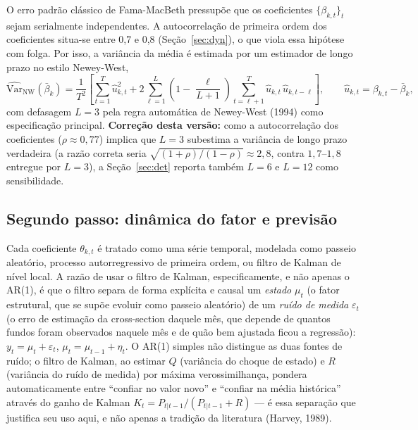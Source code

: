 \documentclass[12pt,a4paper]{article}
\begin{document}
O erro padrão clássico de Fama-MacBeth pressupõe que os coeficientes $\{\beta_{k,t}\}_t$ sejam
serialmente independentes. A autocorrelação de primeira ordem dos coeficientes situa-se entre
0,7 e 0,8 (Seção~\ref{sec:dyn}), o que viola essa hipótese com folga. Por isso, a variância da
média é estimada por um estimador de longo prazo no estilo Newey-West,
\begin{equation}
\widehat{\mathrm{Var}}_{\text{NW}}(\bar{\beta}_k) = \frac{1}{T^{2}}\!\left[
\sum_{t=1}^{T}\widehat{u}_{k,t}^{2}
+ 2\sum_{\ell=1}^{L}\!\left(1-\frac{\ell}{L+1}\right)\!\sum_{t=\ell+1}^{T}\widehat{u}_{k,t}\,\widehat{u}_{k,t-\ell}
\right], \qquad \widehat{u}_{k,t}=\beta_{k,t}-\bar{\beta}_k,
\label{eq:nw}
\end{equation}
com defasagem $L=3$ pela regra automática de Newey-West (1994) como especificação principal.
\textbf{Correção desta versão:} como a autocorrelação dos coeficientes ($\rho\approx0{,}77$)
implica que $L=3$ subestima a variância de longo prazo verdadeira (a razão correta seria
$\sqrt{(1+\rho)/(1-\rho)}\approx2{,}8$, contra $1{,}7$--$1{,}8$ entregue por $L=3$), a
Seção~\ref{sec:det} reporta também $L=6$ e $L=12$ como sensibilidade.

\subsection{Segundo passo: dinâmica do fator e previsão}

Cada coeficiente $\theta_{k,t}$ é tratado como uma série temporal, modelada como passeio
aleatório, processo autorregressivo de primeira ordem, ou filtro de Kalman de nível local. A
razão de usar o filtro de Kalman, especificamente, e não apenas o AR(1), é que o filtro separa de
forma explícita e causal um \emph{estado} $\mu_t$ (o fator estrutural, que se supõe evoluir como
passeio aleatório) de um \emph{ruído de medida} $\varepsilon_t$ (o erro de estimação da
cross-section daquele mês, que depende de quantos fundos foram observados naquele mês e de quão
bem ajustada ficou a regressão): $y_t=\mu_t+\varepsilon_t$, $\mu_t=\mu_{t-1}+\eta_t$. O AR(1)
simples não distingue as duas fontes de ruído; o filtro de Kalman, ao estimar $Q$ (variância do
choque de estado) e $R$ (variância do ruído de medida) por máxima verossimilhança, pondera
automaticamente entre ``confiar no valor novo'' e ``confiar na média histórica'' através do
ganho de Kalman $K_t=P_{t|t-1}/(P_{t|t-1}+R)$ --- é essa separação que justifica seu uso aqui, e
não apenas a tradição da literatura (Harvey, 1989).
\end{document}

